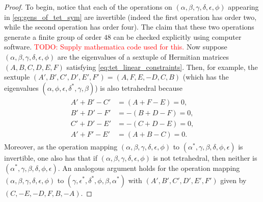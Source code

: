 \documentclass[notitlepage, 10pt]{article}
\begin{document}
\begin{proof}
    To begin, notice that each of the operations on $(\alpha,\beta,\gamma,\delta,\epsilon,\phi)$ appearing in \cref{eq:gens_of_tet_sym} are invertible (indeed the first operation has order two, while the second operation has order four).
    The claim that these two operations generate a finite group of order $48$ can be checked explicitly using computer software. \textcolor{red}{TODO: Supply mathematica code used for this.}
    Now suppose $(\alpha,\beta,\gamma,\delta,\epsilon,\phi)$ are the eigenvalues of a sextuple of Hermitian matrices $(A,B,C,D,E,F)$ satisfying \cref{eq:tet_linear_constraints}.
    Then, for example, the sextuple $(A',B',C',D',E',F') = (A,F,E,-D,C,B)$ (which has the eigenvalues $(\alpha, \phi, \epsilon, \delta^{*}, \gamma, \beta)$) is also tetrahedral because
    \begin{align}
        \label{eq:signed_perm_rows}
        \begin{split}
            A'+B'-C' &= (A+F-E) = 0,  \\
            B'+D'-F' &= -(B+D-F) = 0, \\
            C'+D'-E' &= -(C+D-E) = 0, \\
            A'+F'-E' &= (A+B-C) = 0.
        \end{split}
    \end{align}
    Moreover, as the operation mapping $(\alpha,\beta,\gamma,\delta,\epsilon,\phi)$ to $(\alpha^*, \gamma, \beta, \delta, \phi, \epsilon)$ is invertible, one also has that if $(\alpha,\beta,\gamma,\delta,\epsilon,\phi)$ is not tetrahedral, then neither is $(\alpha^*, \gamma, \beta, \delta, \phi, \epsilon)$.
    An analogous argument holds for the operation mapping $(\alpha,\beta,\gamma,\delta,\epsilon,\phi)$ to $(\gamma, \epsilon^*, \delta^{*}, \phi, \beta, \alpha^*)$ with $(A',B',C',D',E',F')$ given by $(C,-E,-D,F,B,-A)$.
\end{proof}
\end{document}
